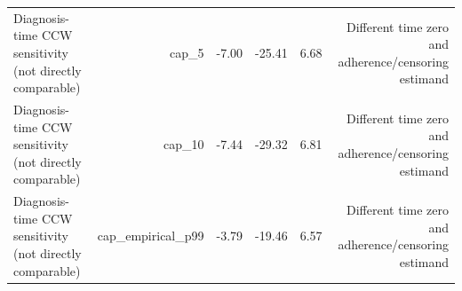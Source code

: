\begin{table}[htbp]
\begin{tabular}{lrrrrr}
Diagnosis-time CCW sensitivity (not directly comparable) & cap\_5 & -7.00 & -25.41 & 6.68 & Different time zero and adherence/censoring estimand \\
Diagnosis-time CCW sensitivity (not directly comparable) & cap\_10 & -7.44 & -29.32 & 6.81 & Different time zero and adherence/censoring estimand \\
Diagnosis-time CCW sensitivity (not directly comparable) & cap\_empirical\_p99 & -3.79 & -19.46 & 6.57 & Different time zero and adherence/censoring estimand \\
\bottomrule
\end{tabular}
\par\vspace{2pt}{\footnotesize Rows from the diagnosis-time clone-censor-weight analysis use a different time zero and estimand and are not direct numerical replications of the landmark ATO result.}
\end{table}
